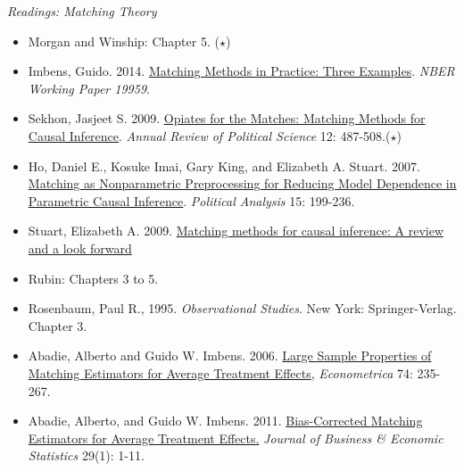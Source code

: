 \documentclass{article}
\begin{document}
\emph{Readings: Matching Theory}
\begin{itemize}
\item Morgan and Winship: Chapter 5. ($\star$)
\item Imbens, Guido. 2014. \href{http://www.nber.org/papers/w19959}{Matching Methods in Practice: Three Examples}. \textit{NBER Working Paper 19959}. 
\item Sekhon, Jasjeet S. 2009.
  \href{http://arjournals.annualreviews.org/doi/abs/10.1146/annurev.polisci.11.060606.135444}
  {Opiates for the Matches: Matching Methods for Causal
    Inference}.\textit{ Annual Review of Political Science} 12:
  487-508.($\star$)
\item
Ho, Daniel E., Kosuke Imai, Gary King, and Elizabeth A. Stuart. 2007.
  \href{http://pan.oxfordjournals.org/cgi/content/abstract/mpl013v1}
  {Matching as Nonparametric Preprocessing for Reducing Model
    Dependence in Parametric Causal Inference}. \textit{Political
    Analysis} 15: 199-236.
\item Stuart, Elizabeth A. 2009.
  \href{http://www.biostat.jhsph.edu/~estuart/Stuart-MatchingMethods-StatSci-Dec09.pdf}
  {Matching methods for causal inference: A review and a look forward}
\item Rubin: Chapters 3 to 5.
\item Rosenbaum, Paul R., 1995. \textit{Observational Studies}. New
  York: Springer-Verlag. Chapter 3.
\item Abadie, Alberto and Guido W. Imbens. 2006.
  \href{http://www.jstor.org/stable/3598929} {Large Sample Properties
    of Matching Estimators for Average Treatment Effects},
  \textit{Econometrica} 74: 235-267.
\item Abadie, Alberto, and Guido W.
  Imbens. 2011. \href{http://www.hks.harvard.edu/fs/aabadie/bcmp.pdf}{Bias-Corrected Matching Estimators
    for Average Treatment Effects.} \textit{Journal of Business \&
    Economic Statistics} 29(1): 1-11.
\end{itemize}
\end{document}
